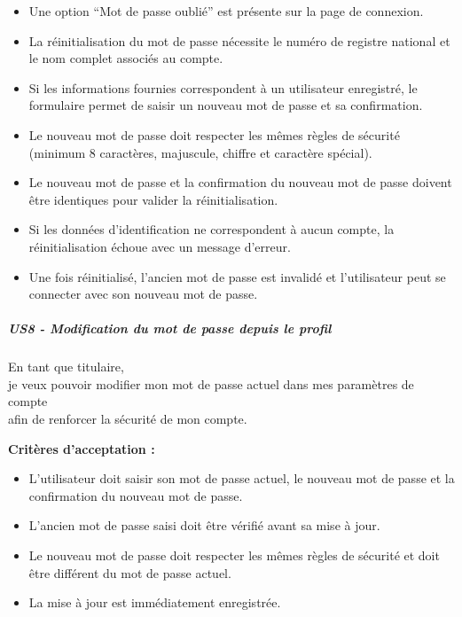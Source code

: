 \begin{itemize}
\tightlist
\item
  Une option ``Mot de passe oublié'' est présente sur la page de
  connexion.
\item
  La réinitialisation du mot de passe nécessite le numéro de registre
  national et le nom complet associés au compte.
\item
  Si les informations fournies correspondent à un utilisateur
  enregistré, le formulaire permet de saisir un nouveau mot de passe et
  sa confirmation.
\item
  Le nouveau mot de passe doit respecter les mêmes règles de sécurité
  (minimum 8 caractères, majuscule, chiffre et caractère spécial).
\item
  Le nouveau mot de passe et la confirmation du nouveau mot de passe
  doivent être identiques pour valider la réinitialisation.
\item
  Si les données d'identification ne correspondent à aucun compte, la
  réinitialisation échoue avec un message d'erreur.
\item
  Une fois réinitialisé, l'ancien mot de passe est invalidé et
  l'utilisateur peut se connecter avec son nouveau mot de passe.
\end{itemize}

\hypertarget{us8---modification-du-mot-de-passe-depuis-le-profil}{%
\subparagraph{US8 - Modification du mot de passe depuis le
profil}\label{us8---modification-du-mot-de-passe-depuis-le-profil}}

En tant que titulaire,\\
je veux pouvoir modifier mon mot de passe actuel dans mes paramètres de
compte\\
afin de renforcer la sécurité de mon compte.

\textbf{Critères d'acceptation :}

\begin{itemize}
\tightlist
\item
  L'utilisateur doit saisir son mot de passe actuel, le nouveau mot de
  passe et la confirmation du nouveau mot de passe.
\item
  L'ancien mot de passe saisi doit être vérifié avant sa mise à jour.
\item
  Le nouveau mot de passe doit respecter les mêmes règles de sécurité et
  doit être différent du mot de passe actuel.
\item
  La mise à jour est immédiatement enregistrée.
\end{itemize}

